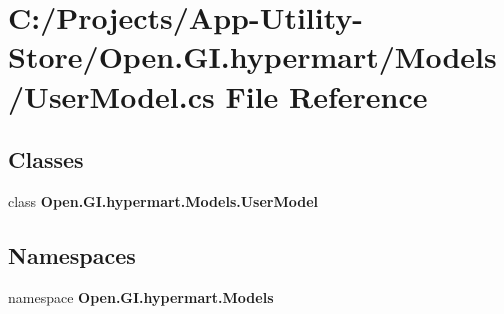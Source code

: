 \section{C\+:/\+Projects/\+App-\/\+Utility-\/\+Store/\+Open.G\+I.\+hypermart/\+Models/\+User\+Model.cs File Reference}
\label{_user_model_8cs}
\subsection*{Classes}
\begin{DoxyCompactItemize}
\item 
class \textbf{ Open.\+G\+I.\+hypermart.\+Models.\+User\+Model}
\end{DoxyCompactItemize}
\subsection*{Namespaces}
\begin{DoxyCompactItemize}
\item 
namespace \textbf{ Open.\+G\+I.\+hypermart.\+Models}
\end{DoxyCompactItemize}
